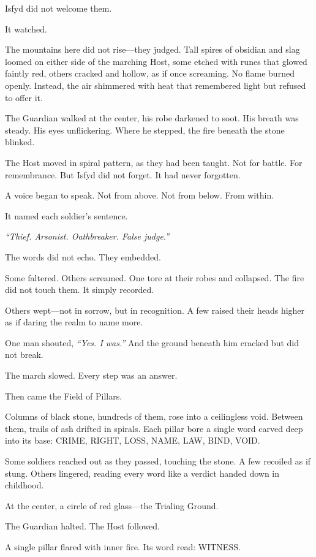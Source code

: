 \documentclass[9pt]{article}
\begin{document}
Isfyd did not welcome them.

It watched.

The mountains here did not rise—they judged. Tall spires of obsidian and slag loomed on either side of the marching Host, some etched with runes that glowed faintly red, others cracked and hollow, as if once screaming. No flame burned openly. Instead, the air shimmered with heat that remembered light but refused to offer it.

The Guardian walked at the center, his robe darkened to soot. His breath was steady. His eyes unflickering. Where he stepped, the fire beneath the stone blinked.

The Host moved in spiral pattern, as they had been taught. Not for battle. For remembrance. But Isfyd did not forget. It had never forgotten.

A voice began to speak. Not from above. Not from below. From within.

It named each soldier’s sentence.

\textit{``Thief. Arsonist. Oathbreaker. False judge.''}

The words did not echo. They embedded.

Some faltered. Others screamed. One tore at their robes and collapsed. The fire did not touch them. It simply recorded.

Others wept—not in sorrow, but in recognition. A few raised their heads higher as if daring the realm to name more.

One man shouted, \textit{``Yes. I was.''} And the ground beneath him cracked but did not break.

The march slowed. Every step was an answer.

Then came the Field of Pillars.

Columns of black stone, hundreds of them, rose into a ceilingless void. Between them, trails of ash drifted in spirals. Each pillar bore a single word carved deep into its base: \textsc{CRIME}, \textsc{RIGHT}, \textsc{LOSS}, \textsc{NAME}, \textsc{LAW}, \textsc{BIND}, \textsc{VOID}.

Some soldiers reached out as they passed, touching the stone. A few recoiled as if stung. Others lingered, reading every word like a verdict handed down in childhood.

At the center, a circle of red glass—the Trialing Ground.

The Guardian halted. The Host followed.

A single pillar flared with inner fire. Its word read: \textsc{WITNESS}.
\end{document}
